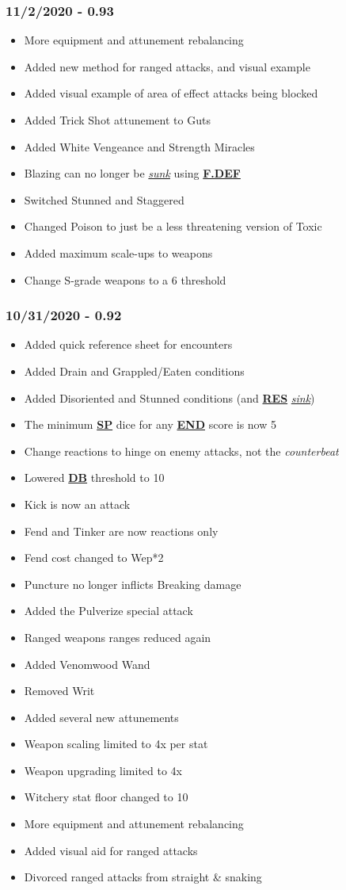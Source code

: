 \documentclass[12pt]{article}
\newcommand{\refto}[1]{\hyperlink{#1}{\textbf{#1}}}
\newcommand{\reftoit}[1]{\hyperlink{#1}{\emph{#1}}}
\begin{document}
\begin{multicols*}{2}
\subsubsection*{11/2/2020 - 0.93}
\begin{itemize}
\item More equipment and attunement rebalancing
\item Added new method for ranged attacks, and visual example
\item Added visual example of area of effect attacks being blocked
\item Added Trick Shot attunement to Guts
\item Added White Vengeance and Strength Miracles
\item Blazing can no longer be \reftoit{sunk} using \refto{F.DEF}
\item Switched Stunned and Staggered
\item Changed Poison to just be a less threatening version of Toxic
\item Added maximum scale-ups to weapons
\item Change S-grade weapons to a 6 threshold
\end{itemize}
\subsubsection*{10/31/2020 - 0.92}
\begin{itemize}
\item Added quick reference sheet for encounters
\item Added Drain and Grappled/Eaten conditions
\item Added Disoriented and Stunned conditions (and \refto{RES} \reftoit{sink})
\item The minimum \refto{SP} dice for any \refto{END} score is now 5
\item Change reactions to hinge on enemy attacks, not the \emph{counterbeat}
\item Lowered \refto{DB} threshold to 10
\item Kick is now an attack
\item Fend and Tinker are now reactions only
\item Fend cost changed to Wep*2
\item Puncture no longer inflicts Breaking damage
\item Added the Pulverize special attack
\item Ranged weapons ranges reduced again
\item Added Venomwood Wand
\item Removed Writ
\item Added several new attunements
\item Weapon scaling limited to 4x per stat
\item Weapon upgrading limited to 4x
\item Witchery stat floor changed to 10
\item More equipment and attunement rebalancing
\item Added visual aid for ranged attacks
\item Divorced ranged attacks from straight \& snaking
\end{itemize}

\end{multicols*}
\end{document}
